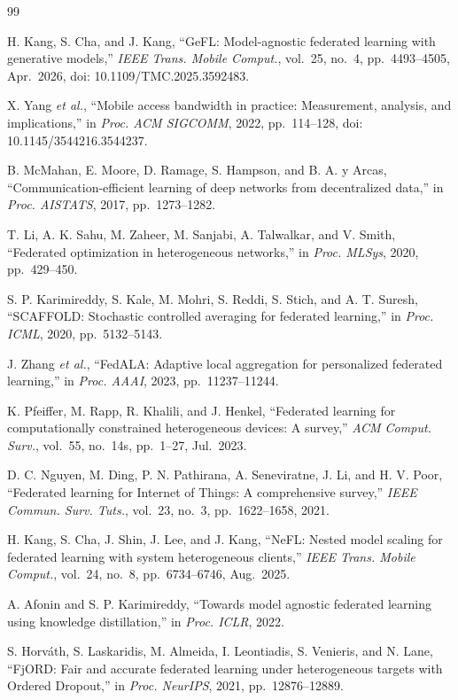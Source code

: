 \documentclass[10pt,journal]{IEEEtran}
\begin{document}
\begin{thebibliography}{99}

H. Kang, S. Cha, and J. Kang, ``GeFL: Model-agnostic federated learning with generative models,'' \emph{IEEE Trans. Mobile Comput.}, vol.~25, no.~4, pp.~4493--4505, Apr.~2026, doi: 10.1109/TMC.2025.3592483.

X. Yang \emph{et al.}, ``Mobile access bandwidth in practice: Measurement, analysis, and implications,'' in \emph{Proc. ACM SIGCOMM}, 2022, pp.~114--128, doi: 10.1145/3544216.3544237.

B. McMahan, E. Moore, D. Ramage, S. Hampson, and B. A. y Arcas, ``Communication-efficient learning of deep networks from decentralized data,'' in \emph{Proc. AISTATS}, 2017, pp.~1273--1282.

T. Li, A. K. Sahu, M. Zaheer, M. Sanjabi, A. Talwalkar, and V. Smith, ``Federated optimization in heterogeneous networks,'' in \emph{Proc. MLSys}, 2020, pp.~429--450.

S. P. Karimireddy, S. Kale, M. Mohri, S. Reddi, S. Stich, and A. T. Suresh, ``SCAFFOLD: Stochastic controlled averaging for federated learning,'' in \emph{Proc. ICML}, 2020, pp.~5132--5143.

J. Zhang \emph{et al.}, ``FedALA: Adaptive local aggregation for personalized federated learning,'' in \emph{Proc. AAAI}, 2023, pp.~11237--11244.

K. Pfeiffer, M. Rapp, R. Khalili, and J. Henkel, ``Federated learning for computationally constrained heterogeneous devices: A survey,'' \emph{ACM Comput. Surv.}, vol.~55, no.~14s, pp.~1--27, Jul.~2023.

D. C. Nguyen, M. Ding, P. N. Pathirana, A. Seneviratne, J. Li, and H. V. Poor, ``Federated learning for Internet of Things: A comprehensive survey,'' \emph{IEEE Commun. Surv. Tuts.}, vol.~23, no.~3, pp.~1622--1658, 2021.

H. Kang, S. Cha, J. Shin, J. Lee, and J. Kang, ``NeFL: Nested model scaling for federated learning with system heterogeneous clients,'' \emph{IEEE Trans. Mobile Comput.}, vol.~24, no.~8, pp.~6734--6746, Aug.~2025.

A. Afonin and S. P. Karimireddy, ``Towards model agnostic federated learning using knowledge distillation,'' in \emph{Proc. ICLR}, 2022.

S. Horv\'ath, S. Laskaridis, M. Almeida, I. Leontiadis, S. Venieris, and N. Lane, ``FjORD: Fair and accurate federated learning under heterogeneous targets with Ordered Dropout,'' in \emph{Proc. NeurIPS}, 2021, pp.~12876--12889.


\end{thebibliography}
\end{document}
